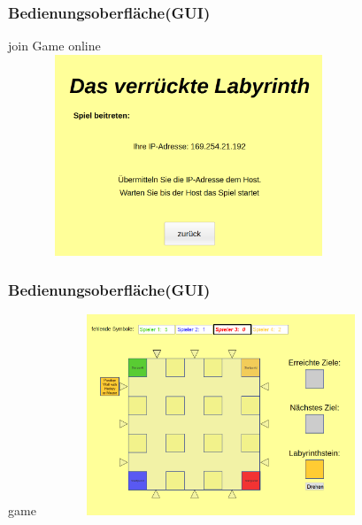 \documentclass{beamer}
\begin{document}
	    \label{Frame5}	
		\begin{frame}
			\frametitle{Bedienungsoberfläche(GUI)}
			\begin{block}{join Game online}
				\includegraphics[width = 10.8cm, height = 6cm]{BilderGUI/05-titeljoin.png}
			\end{block}		
		\end{frame}


	    \label{Frame6}	
		\begin{frame}
			\frametitle{Bedienungsoberfläche(GUI)}
			\begin{block}{game}
				\includegraphics[width = 10.8cm, height = 6cm]{BilderGUI/06-game.png}
			\end{block}		
		\end{frame}
\end{document}
